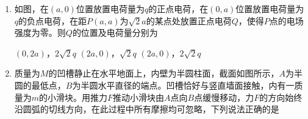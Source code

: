 \documentclass[\gkver]{gaokaozhenti}
\begin{document}
\begin{enumerate}
{	故 D 错误；

	故选 C。
}

\item
如图，在$(a,0)$位置放置电荷量为$q$的正点电荷，在$(0,a)$位置放置电荷量为$q$的负点电荷，在距$P(a,a)$为$\sqrt{2}a$的某点处放置正点电荷$Q$，使得$P$点的电场强度为零。则$Q$的位置及电荷量分别为 


{$(0,2a)$，$2\sqrt{2}q$}
{$(2a,0)$，$\sqrt{2}q$}
{$(2a,0)$，$2\sqrt{2}q$}


\item
质量为$M$的凹槽静止在水平地面上，内壁为半圆柱面，截面如图所示，$A$为半圆的最低点，$B$为半圆水平直径的端点。凹槽恰好与竖直墙面接触，内有一质量为$m$的小滑块。用推力$F$推动小滑块由$A$点向$B$点缓慢移动，力$F$的方向始终沿圆弧的切线方向，在此过程中所有摩擦均可忽略，下列说法正确的是 



\end{enumerate}
\end{document}
